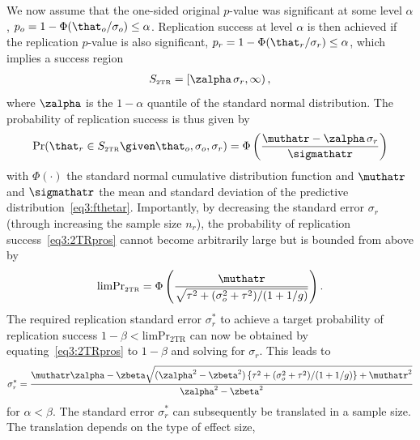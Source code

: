 We now assume that the one-sided original $p$-value was significant at some
level $\alpha$, \ie{} $p_{o} = 1 - \Phi(\that_{o}/\sigma_{o}) \leq \alpha$.
Replication success at level $\alpha$ %
is then achieved if the replication $p$-value is also significant, \ie{}
$p_{r} = 1 - \Phi(\that_{r}/\sigma_{r}) \leq \alpha$, which implies a success
region
\begin{align*}
  S_{\scriptscriptstyle \text{2TR}}
  = \left[\zalpha\, \sigma_{r}, \infty \right),
\end{align*}
where $\zalpha$ is the $1 - \alpha$ quantile of the standard
normal distribution. The probability of replication success is thus given by
\begin{align}
  \label{eq3:2TRpros}
  \Pr(\that_{r} \in S_{\scriptscriptstyle \text{2TR}} \given \that_{o}, \sigma_{o}, \sigma_{r})
  = %
  \Phi\left(\frac{\muthatr - \zalpha \, \sigma_{r}}{\sigmathatr}\right)
\end{align}
with $\Phi(\cdot)$ the standard normal cumulative distribution function and
$\muthatr$ and $\sigmathatr$ the mean and standard deviation of the predictive
distribution~\eqref{eq3:fthetar}. %
Importantly, by decreasing the standard error $\sigma_{r}$ (through increasing
the sample size $n_{r}$), the probability of replication
success~\eqref{eq3:2TRpros} cannot become arbitrarily large but is bounded from
above by
\begin{align}
  \label{eq3:limP2TR}
  \text{limPr}_{\scriptscriptstyle \text{2TR}} =
  \Phi\left(\frac{ \muthatr}{\sqrt{
\tau^{2} + (\sigma^{2}_{o} + \tau^{2})/(1 + 1/g)}}\right).
\end{align}
The required replication standard error $\sigma_{r}^{*}$ to achieve a target
probability of replication success
$1 - \beta < \text{limPr}_{\scriptscriptstyle \text{2TR}}$ can now be obtained
by equating~\eqref{eq3:2TRpros} to $1 - \beta$ and solving for $\sigma_{r}$. This
leads to
\begin{align}
  \label{eq3:ssd2tr}
  \sigma_{r}^{*} =
  \frac{\muthatr \zalpha - \zbeta\sqrt{
  (\zalpha^{2} - \zbeta^{2})\left\{\tau^{2} + (\sigma^{2}_{o} +
  \tau^{2})/(1 + 1/g)\right\} + \muthatr^{2}}}{\zalpha^{2} - \zbeta^{2}}
\end{align}
for $\alpha < \beta$. The standard error $\sigma_{r}^{*}$ can subsequently be
translated in a sample size. The translation depends on the type of effect size,
